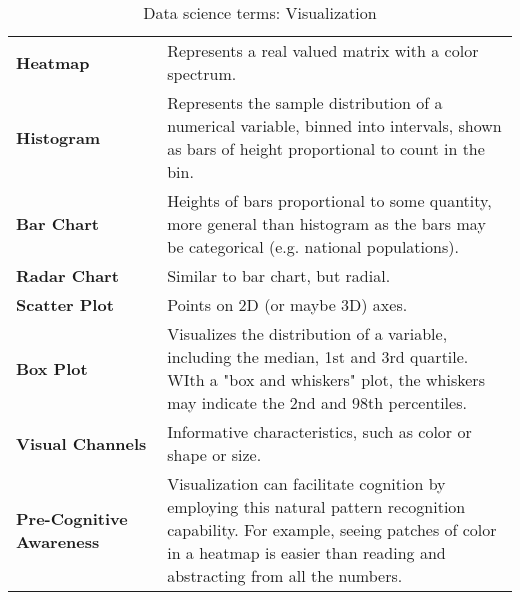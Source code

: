 \begin{appendices}
\begin{table}
\caption{Data science terms: Visualization}
\begin{tabular}{p{0.3\linewidth}p{0.7\linewidth}}
\hline
\textbf{Heatmap} & Represents a real valued matrix with a color spectrum. \\
\textbf{Histogram} & Represents the sample distribution of a numerical variable, binned into intervals, shown as bars of height proportional to count in the bin. \\
\textbf{Bar Chart} & Heights of bars proportional to some quantity, more general than histogram as the bars may be categorical (e.g. national populations). \\
\textbf{Radar Chart} & Similar to bar chart, but radial. \\
\textbf{Scatter Plot} & Points on 2D (or maybe 3D) axes. \\
\textbf{Box Plot} & Visualizes the distribution of a variable, including the median, 1st and 3rd quartile.  WIth a "box and whiskers" plot, the whiskers may
indicate the 2nd and 98th percentiles. \\
\textbf{Visual Channels} & Informative characteristics, such as color or shape or size. \\
\textbf{Pre-Cognitive Awareness} & Visualization can facilitate cognition by employing this natural pattern recognition capability.  For example, seeing patches of
color in a heatmap is easier than reading and abstracting from all the numbers. \\
\hline
\end{tabular}
\end{table}


\end{appendices}
